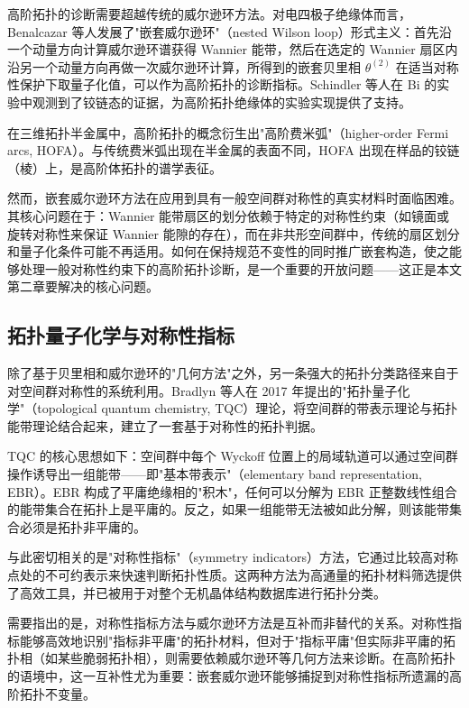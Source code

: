 高阶拓扑的诊断需要超越传统的威尔逊环方法。对电四极子绝缘体而言，Benalcazar 等人发展了"嵌套威尔逊环"（nested Wilson loop）形式主义\cite{bernevig2017quantizedNBP}：首先沿一个动量方向计算威尔逊环谱获得 Wannier 能带，然后在选定的 Wannier 扇区内沿另一个动量方向再做一次威尔逊环计算，所得到的嵌套贝里相 $\theta^{(2)}$ 在适当对称性保护下取量子化值，可以作为高阶拓扑的诊断指标。Schindler 等人在 Bi 的实验中观测到了铰链态的证据\cite{Schindler2018HOTI_Bi}，为高阶拓扑绝缘体的实验实现提供了支持。

在三维拓扑半金属中，高阶拓扑的概念衍生出"高阶费米弧"（higher-order Fermi arcs, HOFA）\cite{bernevig2020HOFA}。与传统费米弧出现在半金属的表面不同，HOFA 出现在样品的铰链（棱）上，是高阶体拓扑的谱学表征。

然而，嵌套威尔逊环方法在应用到具有一般空间群对称性的真实材料时面临困难。其核心问题在于：Wannier 能带扇区的划分依赖于特定的对称性约束（如镜面或旋转对称性来保证 Wannier 能隙的存在），而在非共形空间群中，传统的扇区划分和量子化条件可能不再适用。如何在保持规范不变性的同时推广嵌套构造，使之能够处理一般对称性约束下的高阶拓扑诊断，是一个重要的开放问题——这正是本文第二章要解决的核心问题。

\subsection{拓扑量子化学与对称性指标}

除了基于贝里相和威尔逊环的"几何方法"之外，另一条强大的拓扑分类路径来自于对空间群对称性的系统利用。Bradlyn 等人在 2017 年提出的"拓扑量子化学"（topological quantum chemistry, TQC）理论\cite{PhysRevB.97.035158}，将空间群的带表示理论与拓扑能带理论结合起来，建立了一套基于对称性的拓扑判据。

TQC 的核心思想如下：空间群中每个 Wyckoff 位置上的局域轨道可以通过空间群操作诱导出一组能带——即"基本带表示"（elementary band representation, EBR）。EBR 构成了平庸绝缘相的"积木"，任何可以分解为 EBR 正整数线性组合的能带集合在拓扑上是平庸的。反之，如果一组能带无法被如此分解，则该能带集合必须是拓扑非平庸的。

与此密切相关的是"对称性指标"（symmetry indicators）方法\cite{Khalaf2017Symm_indicator_and_anomaly_TCI}，它通过比较高对称点处的不可约表示来快速判断拓扑性质。这两种方法为高通量的拓扑材料筛选提供了高效工具，并已被用于对整个无机晶体结构数据库进行拓扑分类。

需要指出的是，对称性指标方法与威尔逊环方法是互补而非替代的关系。对称性指标能够高效地识别"指标非平庸"的拓扑材料，但对于"指标平庸"但实际非平庸的拓扑相（如某些脆弱拓扑相），则需要依赖威尔逊环等几何方法来诊断。在高阶拓扑的语境中，这一互补性尤为重要：嵌套威尔逊环能够捕捉到对称性指标所遗漏的高阶拓扑不变量。


